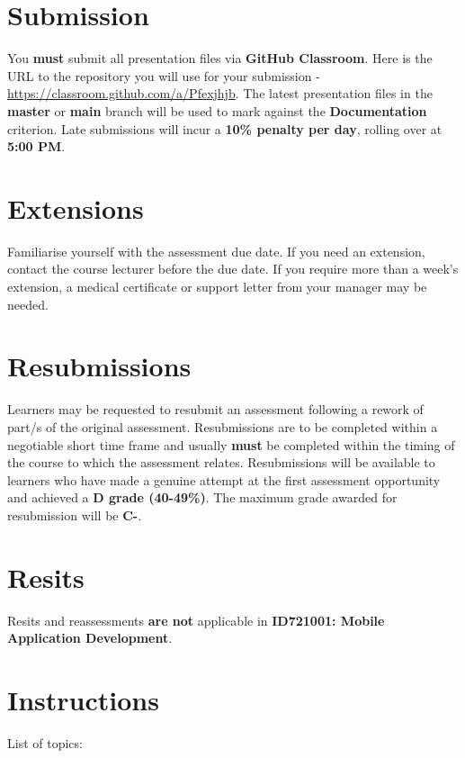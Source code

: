 \documentclass{article}
\begin{document}
\section*{Submission}
You \textbf{must} submit all presentation files via \textbf{GitHub Classroom}. Here is the URL to the repository you will use for your submission - \href{https://classroom.github.com/a/Pfexjhjb}{https://classroom.github.com/a/Pfexjhjb}. The latest presentation files in the \textbf{master} or \textbf{main} branch will be used to mark against the \textbf{Documentation} criterion. Late submissions will incur a \textbf{10\% penalty per day}, rolling over at \textbf{5:00 PM}.

\section*{Extensions}
Familiarise yourself with the assessment due date. If you need an extension, contact the course lecturer before the due date. If you require more than a week's extension, a medical certificate or support letter from your manager may be needed.

\section*{Resubmissions}
Learners may be requested to resubmit an assessment following a rework of part/s of the original assessment. Resubmissions are to be completed within a negotiable short time frame and usually \textbf{must} be completed within the timing of the course to which the assessment relates. Resubmissions will be available to learners who have made a genuine attempt at the first assessment opportunity and achieved a \textbf{D grade (40-49\%)}. The maximum grade awarded for resubmission will be \textbf{C-}.

\section*{Resits}
Resits and reassessments \textbf{are not} applicable in \textbf{ID721001: Mobile Application Development}.

\section*{Instructions}

List of topics:
\end{document}
